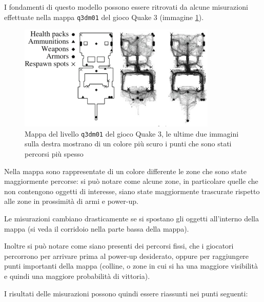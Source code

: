 \documentclass[a4paper,11pt]{article}
\begin{document}
I fondamenti di questo modello possono essere ritrovati da alcune misurazioni effettuate nella mappa \texttt{q3dm01} del gioco Quake 3 (immagine \ref{img:quake}).

\begin{figure}[ht]
\centering
\includegraphics[height=5cm]{d1.png}
\caption{\small{Mappa del livello \texttt{q3dm01} del gioco Quake 3, le ultime due immagini sulla destra mostrano di un colore pi\`u scuro i punti che sono stati percorsi pi\`u spesso}}
\label{img:quake}
\end{figure}

Nella mappa sono rappresentate di un colore differente le zone che sono state maggiormente percorse: si pu\`o notare come alcune zone, in particolare quelle che non contengono oggetti di interesse, siano state maggiormente trascurate rispetto alle zone in prossimit\`a di armi e power-up.

Le misurazioni cambiano drasticamente se si spostano gli oggetti all'interno della mappa (si veda il corridoio nella parte bassa della mappa).

Inoltre si pu\`o notare come siano presenti dei percorsi fissi, che i giocatori percorrono per arrivare prima al power-up desiderato, oppure per raggiungere punti importanti della mappa (colline, o zone in cui si ha una maggiore visibilit\`a e quindi una maggiore probabilit\`a di vittoria).

I risultati delle misurazioni possono quindi essere riassunti nei punti seguenti:
\end{document}
